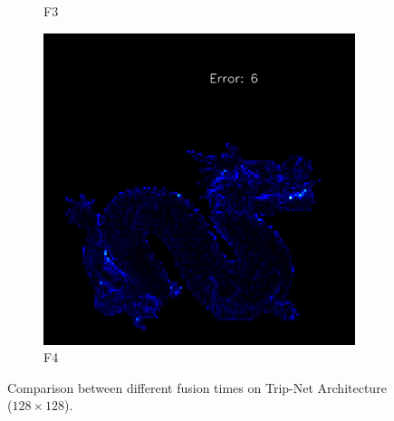 \begin{figure}
\begin{subfigure}[b]{0.18\linewidth}
		\caption{F3}
	\end{subfigure}
	\begin{subfigure}[b]{0.18\linewidth}
		\includegraphics[width=\linewidth]{./Figures/gcnn_synthetic/fancy_eval_7_error_f4.png}
		\caption{F4}
	\end{subfigure}
	\decoRule
	\caption{Comparison between different fusion times on Trip-Net Architecture ($ 128\times128 $). }
	\label{fig:tripnet-fusion-eval}
\end{figure}




